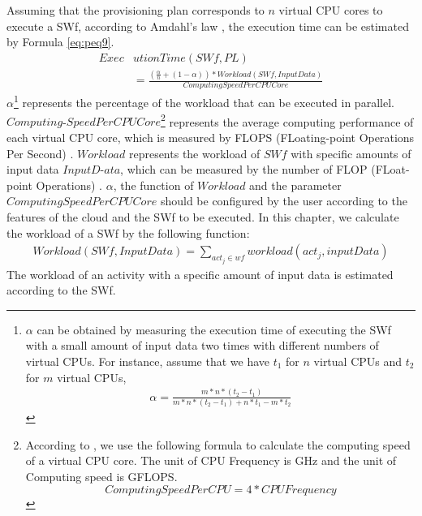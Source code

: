 Assuming that the provisioning plan corresponds to $n$ virtual CPU cores to execute a SWf, according to Amdahl's law \cite{Sun2013}, the execution time can be estimated by Formula \ref{eq:peq9}.
\begin{equation}\label{eq:peq9}
\boxed{
\begin{split}
Exec&utionTime( SWf, PL ) \\&= \frac{( \frac{\alpha}{n} + ( 1 - \alpha ) ) * Workload( SWf, InputData)}{ComputingSpeedPerCPUCore}
\end{split}
}
\end{equation}
$\alpha$\footnote{
$\alpha$ can be obtained by measuring the execution time of executing the SWf with a small amount of input data two times with different numbers of virtual CPUs. For instance, assume that we have $t_1$ for $n$ virtual CPUs and $t_2$ for $m$ virtual CPUs, 
\begin{equation}\label{eq:peq1101}
\begin{split}
\alpha = \frac{m * n * ( t_2 - t_1 )}{ m * n * ( t_2 - t_1 ) + n * t_1 - m * t_2 }
\end{split}
\end{equation}
}
 represents the percentage of the workload that can be executed in parallel. 
$Computing$-$SpeedPerCPUCore$\footnote{
According to \cite{ComputingCapacity}, we use the following formula to calculate the computing speed of a virtual CPU core. The unit of CPU Frequency is GHz and the unit of Computing speed is GFLOPS.
\begin{equation}\label{eq:peq11101}
ComputingSpeedPerCPU = 4 * CPUFrequency
\end{equation}
}
 represents the average computing performance of each virtual CPU core, which is measured by FLOPS (FLoating-point Operations Per Second) \cite{Coutinho2014}. 
$Workload$ represents the workload of $SWf$ with specific amounts of input data $InputD$-$ata$, which can be measured by the number of FLOP (FLoat-point Operations) \cite{Coutinho2014}. 
$\alpha$, the function of $Workload$ and the parameter $ComputingSpeedPerCPUCore$ should be configured by the user according to the features of the cloud and the SWf to be executed. 
In this chapter, we calculate the workload of a SWf by the following function:
\begin{equation}\label{eq:peq101}
\begin{split}
Workload( SWf, InputData ) = \sum_{act_j\in wf}{workload(act_j, inputData)}
\end{split}
\end{equation}
The workload of an activity with a specific amount of input data is estimated according to the SWf.

